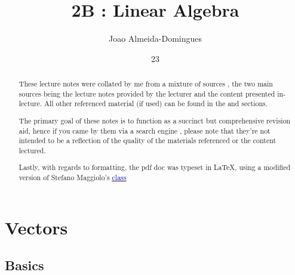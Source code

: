\documentclass[english,course]{Notes}
\title{2B : Linear Algebra}
\author{Joao Almeida-Domingues}
\date{23}{09}{2019}
\begin{document}
\newpage

\begin{abstract}
	\par{These lecture notes were collated by me from a mixture of sources , the two main sources being the lecture notes provided by the lecturer and the content presented in-lecture. All other referenced material (if used) can be found in the  and  sections.}
	\par{The primary goal of these notes is to function as a succinct but comprehensive revision aid, hence if you came by them via a search engine , please note that they're not intended to be a reflection of the quality of the materials referenced or the content lectured.}
	\par{Lastly, with regards to formatting, the pdf doc was typeset in \LaTeX , using a modified version of Stefano Maggiolo's \href{http://blog.poormansmath.net/latex-class-for-lecture-notes/}{\underline{\textcolor{blue}{class}}}}
\end{abstract}
\newpage


\section{Vectors}

\subsection{Basics}








\end{document}
